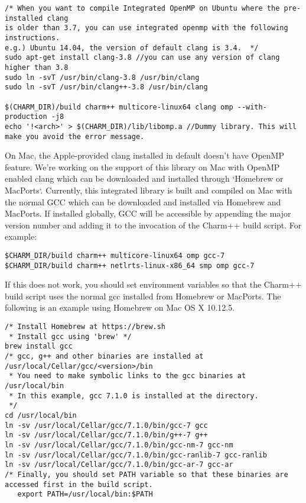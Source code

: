 \begin{verbatim}
/* When you want to compile Integrated OpenMP on Ubuntu where the pre-installed clang
is older than 3.7, you can use integrated openmp with the following instructions.
e.g.) Ubuntu 14.04, the version of default clang is 3.4.  */
sudo apt-get install clang-3.8 //you can use any version of clang higher than 3.8
sudo ln -svT /usr/bin/clang-3.8 /usr/bin/clang
sudo ln -svT /usr/bin/clang++-3.8 /usr/bin/clang

$(CHARM_DIR)/build charm++ multicore-linux64 clang omp --with-production -j8
echo '!<arch>' > $(CHARM_DIR)/lib/libomp.a //Dummy library. This will make you avoid the error message.
\end{verbatim}

On Mac, the Apple-provided clang installed in default doesn't have OpenMP feature. We're working on the support of
this library on Mac with OpenMP enabled clang which can be downloaded and installed through `Homebrew or MacPorts`.
Currently, this integrated library is built and compiled on Mac with the normal GCC which can be downloaded and
installed via Homebrew and MacPorts. If installed globally, GCC will be accessible by appending the major version
number and adding it to the invocation of the Charm++ build script. For example:\\
\begin{verbatim}
$CHARM_DIR/build charm++ multicore-linux64 omp gcc-7
$CHARM_DIR/build charm++ netlrts-linux-x86_64 smp omp gcc-7
\end{verbatim}

If this does not work, you should set environment variables so that the Charm++ build script uses the
normal gcc installed from Homebrew or MacPorts. The following is an example using Homebrew on Mac OS X 10.12.5.

\begin{verbatim}
/* Install Homebrew at https://brew.sh
 * Install gcc using 'brew' */
brew install gcc
/* gcc, g++ and other binaries are installed at /usr/local/Cellar/gcc/<version>/bin
 * You need to make symbolic links to the gcc binaries at /usr/local/bin
 * In this example, gcc 7.1.0 is installed at the directory.
 */
cd /usr/local/bin
ln -sv /usr/local/Cellar/gcc/7.1.0/bin/gcc-7 gcc
ln -sv /usr/local/Cellar/gcc/7.1.0/bin/g++-7 g++
ln -sv /usr/local/Cellar/gcc/7.1.0/bin/gcc-nm-7 gcc-nm
ln -sv /usr/local/Cellar/gcc/7.1.0/bin/gcc-ranlib-7 gcc-ranlib
ln -sv /usr/local/Cellar/gcc/7.1.0/bin/gcc-ar-7 gcc-ar
/* Finally, you should set PATH variable so that these binaries are accessed first in the build script.
   export PATH=/usr/local/bin:$PATH
\end{verbatim}

